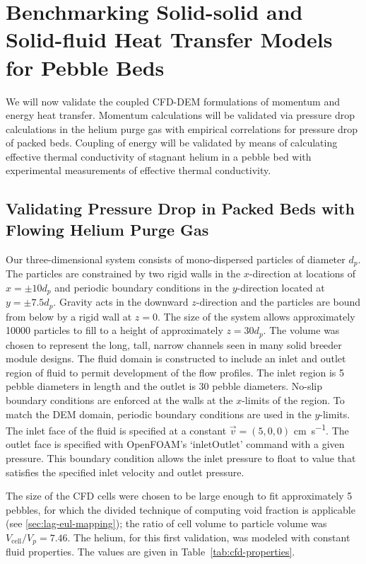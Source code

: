 \FloatBarrier
\section{Benchmarking Solid-solid and Solid-fluid Heat Transfer Models for Pebble Beds}\label{sec:cfd-validate}
We will now validate the coupled CFD-DEM formulations of momentum and energy heat transfer. Momentum calculations will be validated via pressure drop calculations in the helium purge gas with empirical correlations for pressure drop of packed beds. Coupling of energy will be validated by means of calculating effective thermal conductivity of stagnant helium in a pebble bed with experimental measurements of effective thermal conductivity.

\subsection{Validating Pressure Drop in Packed Beds with Flowing Helium Purge Gas}
Our three-dimensional system consists of mono-dispersed particles of diameter $d_p$. The particles are constrained by two rigid walls in the $x$-direction at locations of $x = \pm 10d_p$  and periodic boundary conditions in the $y$-direction located at $y = \pm 7.5d_p$. Gravity acts in the downward $z$-direction and the particles are bound from below by a rigid wall at $z=0$. The size of the system allows approximately \num{10000} particles to fill to a height of approximately $z = 30d_p$. The volume was chosen to represent the long, tall, narrow channels seen in many solid breeder module designs\cite{Cho2008,Poitevin2010,Enoeda2003}. The fluid domain is constructed to include an inlet and outlet region of fluid to permit development of the flow profiles. The inlet region is 5 pebble diameters in length and the outlet is 30 pebble diameters. No-slip boundary conditions are enforced at the walls at the $x$-limits of the region. To match the DEM domain, periodic boundary conditions are used in the $y$-limits. The inlet face of the fluid is specified at a constant $\vec{v} = (5, 0, 0)$ \si{\centi\meter\per\second}. The outlet face is specified with OpenFOAM's `inletOutlet' command with a given pressure. This boundary condition allows the inlet pressure to float to value that satisfies the specified inlet velocity and outlet pressure. 

The size of the CFD cells were chosen to be large enough to fit approximately 5 pebbles, for which the divided technique of computing void fraction is applicable (see \cref{sec:lag-eul-mapping}); the ratio of cell volume to particle volume was $V_\text{cell} / V_p = 7.46$. The helium, for this first validation, was modeled with constant fluid properties. The values are given in Table~\ref{tab:cfd-properties}.

